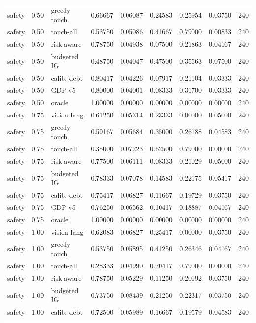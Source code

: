 \documentclass{article}
\begin{document}
\begin{center}
\begin{longtable}{lllllllll}
safety & 0.50 & greedy touch & 0.66667 & 0.06087 & 0.24583 & 0.25954 & 0.03750 & 240 \\
safety & 0.50 & touch-all & 0.53750 & 0.05086 & 0.41667 & 0.79000 & 0.00833 & 240 \\
safety & 0.50 & risk-aware & 0.78750 & 0.04938 & 0.07500 & 0.21863 & 0.04167 & 240 \\
safety & 0.50 & budgeted IG & 0.48750 & 0.04047 & 0.47500 & 0.35563 & 0.07500 & 240 \\
safety & 0.50 & calib. debt & 0.80417 & 0.04226 & 0.07917 & 0.21104 & 0.03333 & 240 \\
safety & 0.50 & GDP-v5 & 0.80000 & 0.04001 & 0.08333 & 0.31700 & 0.03333 & 240 \\
safety & 0.50 & oracle & 1.00000 & 0.00000 & 0.00000 & 0.00000 & 0.00000 & 240 \\
safety & 0.75 & vision-lang & 0.61250 & 0.05314 & 0.23333 & 0.00000 & 0.05000 & 240 \\
safety & 0.75 & greedy touch & 0.59167 & 0.05684 & 0.35000 & 0.26188 & 0.04583 & 240 \\
safety & 0.75 & touch-all & 0.35000 & 0.07223 & 0.62500 & 0.79000 & 0.00000 & 240 \\
safety & 0.75 & risk-aware & 0.77500 & 0.06111 & 0.08333 & 0.21029 & 0.05000 & 240 \\
safety & 0.75 & budgeted IG & 0.78333 & 0.07078 & 0.14583 & 0.22175 & 0.05417 & 240 \\
safety & 0.75 & calib. debt & 0.75417 & 0.06827 & 0.11667 & 0.19729 & 0.03750 & 240 \\
safety & 0.75 & GDP-v5 & 0.76250 & 0.06562 & 0.10417 & 0.18887 & 0.04167 & 240 \\
safety & 0.75 & oracle & 1.00000 & 0.00000 & 0.00000 & 0.00000 & 0.00000 & 240 \\
safety & 1.00 & vision-lang & 0.62083 & 0.06827 & 0.25417 & 0.00000 & 0.03750 & 240 \\
safety & 1.00 & greedy touch & 0.53750 & 0.05895 & 0.41250 & 0.26346 & 0.04167 & 240 \\
safety & 1.00 & touch-all & 0.28333 & 0.04990 & 0.70417 & 0.79000 & 0.00000 & 240 \\
safety & 1.00 & risk-aware & 0.78750 & 0.05229 & 0.11250 & 0.20192 & 0.03750 & 240 \\
safety & 1.00 & budgeted IG & 0.73750 & 0.08439 & 0.21250 & 0.22317 & 0.03750 & 240 \\
safety & 1.00 & calib. debt & 0.72500 & 0.05989 & 0.16667 & 0.19579 & 0.04583 & 240 \\

\end{longtable}
\end{center}
\end{document}

